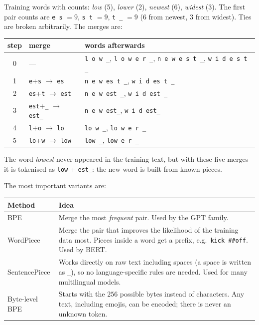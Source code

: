\begin{example}
Training words with counts: \emph{low} (5), \emph{lower} (2), \emph{newest} (6), \emph{widest} (3). The first pair counts are \texttt{e s} $=9$, \texttt{s t} $=9$, \texttt{t \_} $=9$ ($6$ from newest, $3$ from widest). Ties are broken arbitrarily. The merges are:
\begin{center}
\renewcommand{\arraystretch}{1.15}
\begin{tabular}{c|l|l}
step & merge & words afterwards\\ \hline
0 & --- & \texttt{l o w \_}, \texttt{l o w e r \_}, \texttt{n e w e s t \_}, \texttt{w i d e s t \_}\\
1 & \texttt{e}+\texttt{s} $\to$ \texttt{es} & \texttt{n e w es t \_}, \texttt{w i d es t \_}\\
2 & \texttt{es}+\texttt{t} $\to$ \texttt{est} & \texttt{n e w est \_}, \texttt{w i d est \_}\\
3 & \texttt{est}+\texttt{\_} $\to$ \texttt{est\_} & \texttt{n e w est\_}, \texttt{w i d est\_}\\
4 & \texttt{l}+\texttt{o} $\to$ \texttt{lo} & \texttt{lo w \_}, \texttt{lo w e r \_}\\
5 & \texttt{lo}+\texttt{w} $\to$ \texttt{low} & \texttt{low \_}, \texttt{low e r \_}\\
\end{tabular}
\end{center}
The word \emph{lowest} never appeared in the training text, but with these five merges it is tokenised as \texttt{low} + \texttt{est\_}: the new word is built from known pieces.
\end{example}

The most important variants are:
\begin{center}
\renewcommand{\arraystretch}{1.3}
\begin{tabular}{p{3.2cm}p{10.5cm}}
\textbf{Method} & \textbf{Idea}\\ \hline
BPE & Merge the most \emph{frequent} pair. Used by the GPT family.\\
WordPiece & Merge the pair that improves the likelihood of the training data most. Pieces inside a word get a prefix, e.g.\ \texttt{kick \#\#off}. Used by BERT.\\
SentencePiece & Works directly on raw text including spaces (a space is written as \texttt{\_}), so no language-specific rules are needed. Used for many multilingual models.\\
Byte-level BPE & Starts with the $256$ possible bytes instead of characters. Any text, including emojis, can be encoded; there is never an unknown token.\\
\end{tabular}
\end{center}

